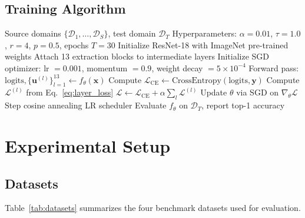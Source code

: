 \documentclass[12pt,a4paper]{article}
\begin{document}
\subsection{Training Algorithm}

\begin{algorithm}[H]
\caption{M\textsuperscript{2}-CL Training}
\label{alg:training}
\begin{algorithmic}[1]
\Require Source domains $\{\mathcal{D}_1,\ldots,\mathcal{D}_S\}$, test domain $\mathcal{D}_T$
\Require Hyperparameters: $\alpha{=}0.01$, $\tau{=}1.0$, $r{=}4$, $p{=}0.5$, epochs $T{=}30$
\State Initialize ResNet-18 with ImageNet pre-trained weights
\State Attach 13 extraction blocks to intermediate layers
\State Initialize SGD optimizer: lr $= 0.001$, momentum $= 0.9$, weight decay $= 5{\times}10^{-4}$
    \State Forward pass: $\text{logits}, \{\mathbf{u}^{(l)}\}_{l=1}^{13} \gets f_\theta(\mathbf{x})$
    \State Compute $\mathcal{L}_{\text{CE}} \gets \text{CrossEntropy}(\text{logits}, \mathbf{y})$
      \State Compute $\mathcal{L}^{(l)}$ from Eq.~\eqref{eq:layer_loss}
    \EndFor
    \State $\mathcal{L} \gets \mathcal{L}_{\text{CE}} + \alpha \sum_l \mathcal{L}^{(l)}$
    \State Update $\theta$ via SGD on $\nabla_\theta \mathcal{L}$
  \EndFor
  \State Step cosine annealing LR scheduler
\EndFor
\State Evaluate $f_\theta$ on $\mathcal{D}_T$, report top-1 accuracy
\end{algorithmic}
\end{algorithm}

\section{Experimental Setup}
\label{sec:experiments}

\subsection{Datasets}

Table~\ref{tab:datasets} summarizes the four benchmark datasets used for evaluation.
\end{document}
